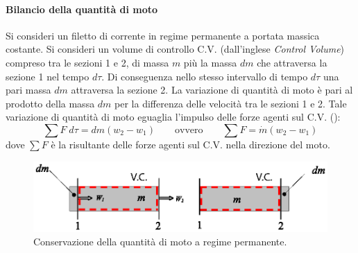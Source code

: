 \paragraph{Bilancio della quantità di moto}
Si consideri un filetto di corrente in regime permanente a portata massica costante. Si consideri un volume di controllo C.V. (dall'inglese \textit{Control Volume}) compreso tra le sezioni 1 e 2, di massa $m$ più la massa $dm$ che attraversa la sezione 1 nel tempo $d\tau$. Di conseguenza nello stesso intervallo di tempo $d\tau$ una pari massa $dm$ attraversa la sezione 2. La variazione di quantità di moto è pari al prodotto della massa $dm$ per la differenza delle velocità tra le sezioni 1 e 2. Tale variazione di quantità di moto eguaglia l'impulso delle forze agenti sul C.V. ():
\[\sum{F\;d\tau}=dm(w_2-w_1)\qquad \textrm{ovvero}\qquad \sum{F}=\dot{m}(w_2-w_1)\]
dove \(\sum{F}\) è la risultante delle forze agenti sul C.V. nella direzione del moto.
\begin{figure}[htbp] %
    \centering
    \includegraphics[width=\textwidth]{fig/fluidodinamica/quantitamoto.eps}
    \caption{Conservazione della quantità di moto a regime permanente.} 
    \label{fig:quantitamoto}
\end{figure}


